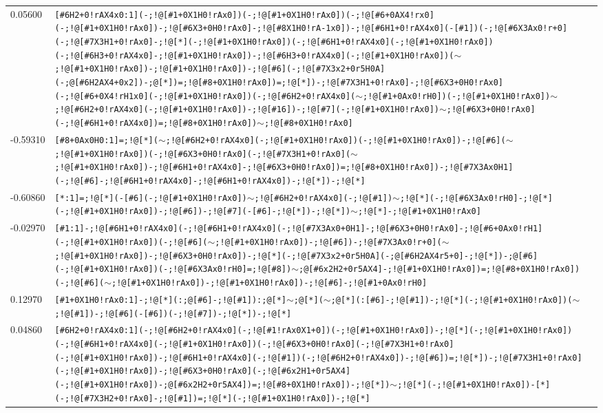 \begin{longtable}{>{\baselineskip=10pt}p{} >{\baselineskip=10pt}p{}}
0.05600 & \texttt{[\#6H2+0!rAX4x0:1](-;!@[\#1+0X1H0!rAx0])(-;!@[\#1+0X1H0!rAx0])(-;!@[\#6+0AX4!rx0](-;!@[\#1+0X1H0!rAx0])-;!@[\#6X3+0H0!rAx0]-;!@[\#8X1H0!rA-1x0])-;!@[\#6H1+0!rAX4x0](-[\#1])(-;!@[\#6X3Ax0!r+0](-;!@[\#7X3H1+0!rAx0]-;!@[*](-;!@[\#1+0X1H0!rAx0])(-;!@[\#6H1+0!rAX4x0](-;!@[\#1+0X1H0!rAx0])(-;!@[\#6H3+0!rAX4x0]-;!@[\#1+0X1H0!rAx0])-;!@[\#6H3+0!rAX4x0](-;!@[\#1+0X1H0!rAx0])($\sim$;!@[\#1+0X1H0!rAx0])-;!@[\#1+0X1H0!rAx0])-;!@[\#6](-;!@[\#7X3x2+0r5H0A](-;@[\#6H2AX4+0x2])-;@[*])=;!@[\#8+0X1H0!rAx0])=;!@[*])-;!@[\#7X3H1+0!rAx0]-;!@[\#6X3+0H0!rAx0](-;!@[\#6+0X4!rH1x0](-;!@[\#1+0X1H0!rAx0])(-;!@[\#6H2+0!rAX4x0]($\sim$;!@[\#1+0Ax0!rH0])(-;!@[\#1+0X1H0!rAx0])$\sim$;!@[\#6H2+0!rAX4x0](-;!@[\#1+0X1H0!rAx0])-;!@[\#16])-;!@[\#7](-;!@[\#1+0X1H0!rAx0])$\sim$;!@[\#6X3+0H0!rAx0](-;!@[\#6H1+0!rAX4x0])=;!@[\#8+0X1H0!rAx0])$\sim$;!@[\#8+0X1H0!rAx0]} \\ 
-0.59310 & \texttt{[\#8+0Ax0H0:1]=;!@[*]($\sim$;!@[\#6H2+0!rAX4x0](-;!@[\#1+0X1H0!rAx0])(-;!@[\#1+0X1H0!rAx0])-;!@[\#6]($\sim$;!@[\#1+0X1H0!rAx0])(-;!@[\#6X3+0H0!rAx0](-;!@[\#7X3H1+0!rAx0]($\sim$;!@[\#1+0X1H0!rAx0])-;!@[\#6H1+0!rAX4x0]-;!@[\#6X3+0H0!rAx0])=;!@[\#8+0X1H0!rAx0])-;!@[\#7X3Ax0H1](-;!@[\#6]-;!@[\#6H1+0!rAX4x0]-;!@[\#6H1+0!rAX4x0])-;!@[*])-;!@[*]} \\ 
-0.60860 & \texttt{[*:1]=;!@[*](-[\#6](-;!@[\#1+0X1H0!rAx0])$\sim$;!@[\#6H2+0!rAX4x0](-;!@[\#1])$\sim$;!@[*](-;!@[\#6X3Ax0!rH0]-;!@[*](-;!@[\#1+0X1H0!rAx0])-;!@[\#6])-;!@[\#7](-[\#6]-;!@[*])-;!@[*])$\sim$;!@[*]-;!@[\#1+0X1H0!rAx0]} \\ 
-0.02970 & \texttt{[\#1:1]-;!@[\#6H1+0!rAX4x0](-;!@[\#6H1+0!rAX4x0](-;!@[\#7X3Ax0+0H1]-;!@[\#6X3+0H0!rAx0]-;!@[\#6+0Ax0!rH1](-;!@[\#1+0X1H0!rAx0])(-;!@[\#6]($\sim$;!@[\#1+0X1H0!rAx0])-;!@[\#6])-;!@[\#7X3Ax0!r+0]($\sim$;!@[\#1+0X1H0!rAx0])-;!@[\#6X3+0H0!rAx0])-;!@[*](-;!@[\#7X3x2+0r5H0A](-;@[\#6H2AX4r5+0]-;!@[*])-;@[\#6](-;!@[\#1+0X1H0!rAx0])(-;!@[\#6X3Ax0!rH0]=;!@[\#8])$\sim$;@[\#6x2H2+0r5AX4]-;!@[\#1+0X1H0!rAx0])=;!@[\#8+0X1H0!rAx0])(-;!@[\#6]($\sim$;!@[\#1+0X1H0!rAx0])-;!@[\#1+0X1H0!rAx0])-;!@[\#6]-;!@[\#1+0Ax0!rH0]} \\ 
0.12970 & \texttt{[\#1+0X1H0!rAx0:1]-;!@[*](:;@[\#6]-;!@[\#1]):;@[*]$\sim$;@[*]($\sim$;@[*](:[\#6]-;!@[\#1])-;!@[*](-;!@[\#1+0X1H0!rAx0])($\sim$;!@[\#1])-;!@[\#6](-[\#6])(-;!@[\#7])-;!@[*])-;!@[*]} \\ 
0.04860 & \texttt{[\#6H2+0!rAX4x0:1](-;!@[\#6H2+0!rAX4x0](-;!@[\#1!rAx0X1+0])(-;!@[\#1+0X1H0!rAx0])-;!@[*](-;!@[\#1+0X1H0!rAx0])(-;!@[\#6H1+0!rAX4x0](-;!@[\#1+0X1H0!rAx0])(-;!@[\#6X3+0H0!rAx0](-;!@[\#7X3H1+0!rAx0](-;!@[\#1+0X1H0!rAx0])-;!@[\#6H1+0!rAX4x0](-;!@[\#1])(-;!@[\#6H2+0!rAX4x0])-;!@[\#6])=;!@[*])-;!@[\#7X3H1+0!rAx0](-;!@[\#1+0X1H0!rAx0])-;!@[\#6X3+0H0!rAx0](-;!@[\#6x2H1+0r5AX4](-;!@[\#1+0X1H0!rAx0])-;@[\#6x2H2+0r5AX4])=;!@[\#8+0X1H0!rAx0])-;!@[*])$\sim$;!@[*](-;!@[\#1+0X1H0!rAx0])-[*](-;!@[\#7X3H2+0!rAx0]-;!@[\#1])=;!@[*](-;!@[\#1+0X1H0!rAx0])-;!@[*]} \\ 

\end{longtable}
